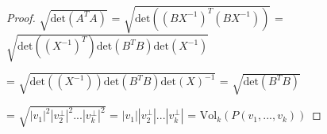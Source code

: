 \begin{proof}
        \hspace{0.5cm}
        $\sqrt{\text{det}(A^TA)}$
        = $\sqrt{\text{det}((BX^{-1})^T(BX^{-1}))}$
        = $\sqrt{\text{det}((X^{-1})^T) \text{det}(B^TB) \text{det}(X^{-1})}$

        \hspace{2.8cm}
        = $\sqrt{\text{det}((X^{-1})) \text{det}(B^TB) \text{det}(X)^{-1}}$
        = $\sqrt{\text{det}(B^TB)}$
        
        \hspace{2.8cm}
        = $\sqrt{|v_1|^2 |v_2^{\perp}|^2 ... |v_k^{\perp}|^2}$
        = $|v_1| |v_2^{\perp}| ... |v_k^{\perp}|$
        = $\text{Vol}_k(P(v_1,...,v_k))$
    \end{proof}




















